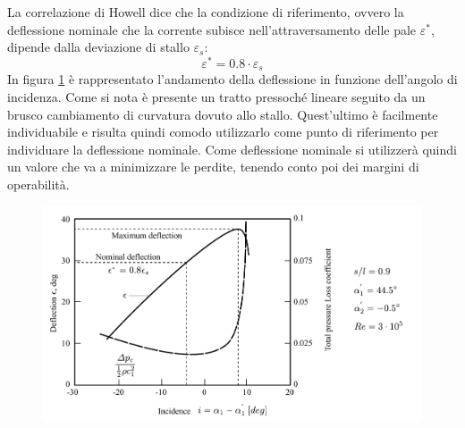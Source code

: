 La correlazione di Howell dice che la condizione di riferimento, ovvero la deflessione nominale che la corrente subisce nell'attraversamento delle pale $\varepsilon^*$, dipende dalla deviazione di stallo $\varepsilon_s$:
\begin{equation}
\varepsilon^* = 0.8 \cdot \varepsilon_s
\end{equation}
In figura \ref{fig:Howell} è rappresentato l'andamento della deflessione in funzione dell'angolo di incidenza. Come si nota è presente un tratto pressoché lineare seguito da un brusco cambiamento di curvatura dovuto allo stallo. Quest'ultimo è facilmente individuabile e risulta quindi comodo utilizzarlo come punto di riferimento per individuare la deflessione nominale. Come deflessione nominale si utilizzerà quindi un valore che va a minimizzare le perdite, tenendo conto poi dei margini di operabilità.  
\begin{figure}
\centering
  \includegraphics[width=\textwidth]{fig/Howell.pdf}
\caption{}
\label{fig:Howell}
\end{figure}

